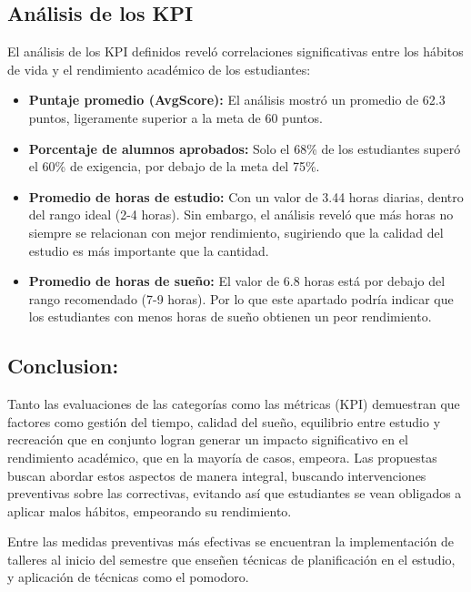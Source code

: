 \documentclass[12pt,letterpaper]{report}
\begin{document}
\subsection{Análisis de los KPI}
El análisis de los KPI definidos reveló correlaciones significativas entre los hábitos de vida y el rendimiento académico de los estudiantes:

\begin{itemize}
    \item \textbf{Puntaje promedio (AvgScore):} El análisis mostró un promedio de 62.3 puntos, ligeramente superior a la meta de 60 puntos.
    
    \item \textbf{Porcentaje de alumnos aprobados:} Solo el 68\% de los estudiantes superó el 60\% de exigencia, por debajo de la meta del 75\%.
    
    \item \textbf{Promedio de horas de estudio:} Con un valor de 3.44 horas diarias, dentro del rango ideal (2-4 horas). Sin embargo, el análisis reveló que más horas no siempre se relacionan con mejor rendimiento, sugiriendo que la calidad del estudio es más importante que la cantidad.
    
    \item \textbf{Promedio de horas de sueño:} El valor de 6.8 horas está por debajo del rango recomendado (7-9 horas).
    Por lo que este apartado podría indicar que los estudiantes con menos horas de sueño obtienen un peor rendimiento.
\end{itemize}

\subsection{Conclusion:} 
Tanto las evaluaciones de las categorías como las métricas (KPI) demuestran que factores como gestión del tiempo, calidad del sueño, equilibrio entre estudio y recreación que en conjunto logran generar un impacto significativo en el rendimiento académico, que en la mayoría de casos, empeora. Las propuestas buscan abordar estos aspectos de manera integral, buscando intervenciones preventivas sobre las correctivas, evitando así que estudiantes se vean obligados a aplicar malos hábitos, empeorando su rendimiento.

\space
Entre las medidas preventivas más efectivas se encuentran la implementación de talleres al inicio del semestre que enseñen técnicas de planificación en el estudio, y aplicación de técnicas como el pomodoro.
\end{document}
